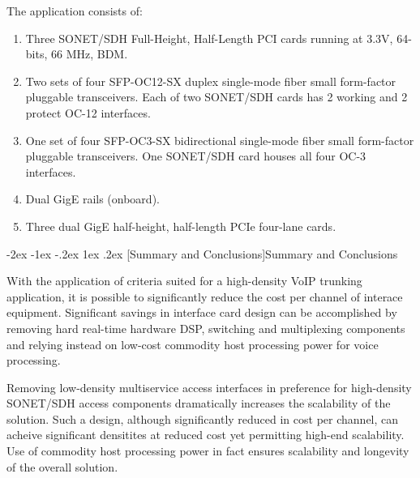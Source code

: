 \documentclass[letterpaper,final,notitlepage,twocolumn,10pt,twoside]{article}
\makeatletter
\renewcommand\section{\@startsection {section}{1}{\z@}%
                                   {-2ex \@plus -1ex \@minus -.2ex}%
                                   {1ex \@plus .2ex}%
                                   {\normalfont\large\bfseries}}
\makeatother
\begin{document}
The application consists of:

\begin{enumerate}
	\item Three SONET/SDH Full-Height, Half-Length PCI cards running at
		3.3V, 64-bits, 66 MHz, BDM.
	\item Two sets of four SFP-OC12-SX duplex single-mode fiber
		small form-factor pluggable transceivers.  Each of two SONET/SDH
		cards has 2 working and 2 protect OC-12 interfaces.
	\item One set of four SFP-OC3-SX bidirectional single-mode fiber small
		form-factor pluggable transceivers.  One SONET/SDH card houses
		all four OC-3 interfaces.
	\item Dual GigE rails (onboard).
	\item Three dual GigE half-height, half-length PCIe four-lane cards.
\end{enumerate}


\section[Summary and Conclusions]{Summary and Conclusions}

With the application of criteria suited for a high-density VoIP trunking
application, it is possible to significantly reduce the cost per channel of
interace equipment.  Significant savings in interface card design can be
accomplished by removing hard real-time hardware DSP, switching and multiplexing
components and relying instead on low-cost commodity host processing power for
voice processing.

Removing low-density multiservice access interfaces in preference for
high-density SONET/SDH access components dramatically increases the scalability
of the solution.  Such a design, although significantly reduced in cost per
channel, can acheive significant densitites at reduced cost yet permitting
high-end scalability.  Use of commodity host processing power in fact ensures
scalability and longevity of the overall solution.

\FloatBarrier
{}


\end{document}
